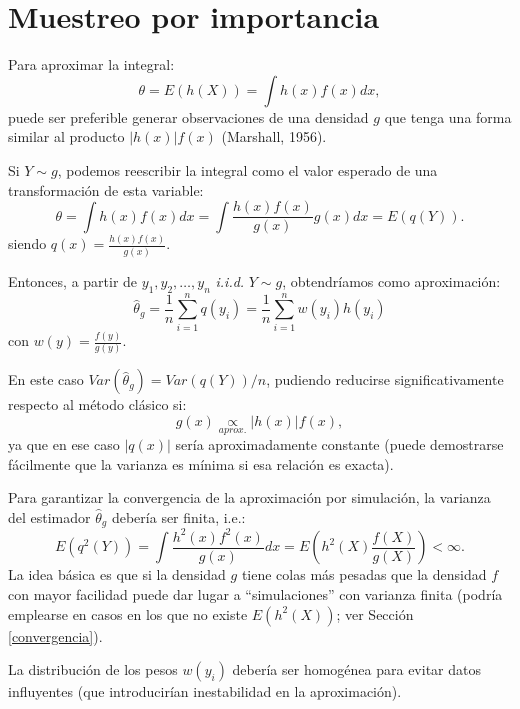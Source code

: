 \documentclass[
  spanish,
  10pt,
]{book}
\theoremstyle{break}
\theoremstyle{nonumberplain}
\begin{document}
\section{Muestreo por importancia}\label{muestreo-importancia}

Para aproximar la integral:
\[\theta = E\left( h\left( X\right) \right) = \int h\left( x\right) f(x)dx,\]
puede ser preferible generar observaciones de una densidad \(g\) que tenga una forma similar al producto \(|h(x)|f(x)\) (Marshall, 1956).

Si \(Y\sim g\), podemos reescribir la integral como el valor esperado de una transformación de esta variable:
\[\theta  = \int h\left( x\right) f(x)dx 
 = \int \frac{h\left( x\right) f(x)}{g(x)}g(x)dx
 = E\left( q\left( Y\right) \right).\]
siendo
\(q\left( x\right)  = \frac{h\left( x\right) f(x)}{g(x)}\).

Entonces, a partir de \(y_1,y_2,\ldots ,y_n\) \emph{i.i.d.} \(Y\sim g\), obtendríamos como aproximación:
\[\hat{\theta}_{g} = \frac{1}{n}\sum\limits_{i=1}^nq\left( y_i\right) 
= \frac{1}{n}\sum\limits_{i=1}^nw(y_i)h\left( y_i\right)\]
con \(w(y) = \frac{f(y)}{g(y)}\).

En este caso \(Var(\hat{\theta}_{g}) = Var\left( q\left( Y\right) \right) /n\), pudiendo reducirse significativamente respecto al método clásico si:
\[g(x)\underset{aprox.}{\propto } \left\vert h(x) \right\vert f(x),\]
ya que en ese caso \(\left\vert q(x) \right\vert\) sería aproximadamente constante (puede demostrarse fácilmente que la varianza es mínima si esa relación es exacta).

Para garantizar la convergencia de la aproximación por simulación, la varianza del estimador \(\hat{\theta}_{g}\) debería ser finita, i.e.:
\[E\left( q^2\left( Y\right) \right)  
= \int \frac{h^2\left( x\right)f^2(x)}{g(x)}dx 
= E\left( h^2\left( X\right) \frac{f(X)}{g(X)}\right)
< \infty.\]
La idea básica es que si la densidad \(g\) tiene colas más pesadas que la densidad \(f\) con mayor facilidad puede dar lugar a ``simulaciones'' con varianza finita (podría emplearse en casos en los que no existe \(E \left( h^2 \left( X \right) \right)\); ver Sección \ref{convergencia}).

La distribución de los pesos \(w(y_i)\) debería ser homogénea para evitar datos influyentes (que introducirían inestabilidad en la aproximación).
\end{document}

